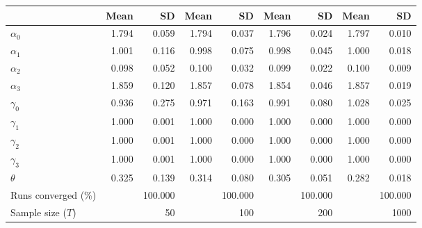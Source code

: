 
\begin{tabular}[t]{lrrrrrrrr}
\toprule
  & Mean & SD & Mean  & SD  & Mean   & SD   & Mean    & SD   \\
\midrule
$\alpha_{0}$ & 1.794 & 0.059 & 1.794 & 0.037 & 1.796 & 0.024 & 1.797 & 0.010\\
$\alpha_{1}$ & 1.001 & 0.116 & 0.998 & 0.075 & 0.998 & 0.045 & 1.000 & 0.018\\
$\alpha_{2}$ & 0.098 & 0.052 & 0.100 & 0.032 & 0.099 & 0.022 & 0.100 & 0.009\\
$\alpha_{3}$ & 1.859 & 0.120 & 1.857 & 0.078 & 1.854 & 0.046 & 1.857 & 0.019\\
$\gamma_{0}$ & 0.936 & 0.275 & 0.971 & 0.163 & 0.991 & 0.080 & 1.028 & 0.025\\
$\gamma_{1}$ & 1.000 & 0.001 & 1.000 & 0.000 & 1.000 & 0.000 & 1.000 & 0.000\\
$\gamma_{2}$ & 1.000 & 0.001 & 1.000 & 0.000 & 1.000 & 0.000 & 1.000 & 0.000\\
$\gamma_{3}$ & 1.000 & 0.001 & 1.000 & 0.000 & 1.000 & 0.000 & 1.000 & 0.000\\
$\theta$ & 0.325 & 0.139 & 0.314 & 0.080 & 0.305 & 0.051 & 0.282 & 0.018\\
Runs converged (\%) &  & 100.000 &  & 100.000 &  & 100.000 &  & 100.000\\
Sample size ($T$) &  & 50 &  & 100 &  & 200 &  & 1000\\
\bottomrule
\end{tabular}
